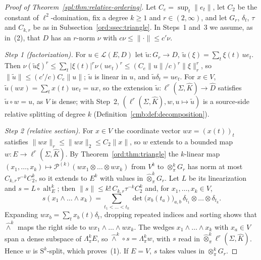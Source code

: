 \documentclass[11pt]{amsart}
\theoremstyle{definition}
\theoremstyle{remark}
\numberwithin{equation}{section}
\newcommand{\cL}{\mathcal L}
\newcommand{\abs}[1]{\lvert #1\rvert}
\newcommand{\norm}[1]{\lVert #1\rVert}
\newcommand{\Kh}{\widehat K}
\theoremstyle{plain}
\theoremstyle{definition}
\theoremstyle{plain}
\newcommand{\alt}{\operatorname{alt}}
\newcommand{\cP}{\mathcal P}
\begin{document}
\begin{proof}[Proof of Theorem~\ref{spl:thm:relative-ordering}]
Let $C_e=\sup_t\norm{e_t}$, let $C_2$ be the constant of $\ell^2$\nobreakdash-domination, fix a degree $k\ge1$ and
$r\in(2,\infty)$, and let $G_r$, $\delta_t$, $\tau$ and $C_{k,r}$ be as in Subsection~\ref{ord:ssec:triangle}. In
Steps~1 and~3 we assume, as in~(2), that $D$ has an $r$\nobreakdash-norm $\nu$ with $c\nu\le\norm\cdot\le c'\nu$.

\emph{Step 1 (factorization).} For $u\in\cL(E,D)$ let $\tilde u\colon G_r\to D$, $\tilde u(\xi)=\sum_t\xi(t)\,ue_t$. Then
$\nu(\tilde u\xi)^r\le\sum_t\abs{\xi(t)}^r\nu(ue_t)^r\le(C_e\norm u/c)^r\norm\xi_r^r$, so
$\norm{\tilde u}\le(c'/c)C_e\norm u$; $\tilde u$ is linear in $u$, and $\tilde u\delta_t=ue_t$. For $x\in V$,
$\tilde u(wx)=\sum_tx(t)\,ue_t=ux$, so the extension $\tilde u\colon\ell^r(\Sigma,\Kh)\to\widehat D$ satisfies
$\tilde u\circ w=u$, as $V$ is dense; with Step~2, $(\ell^r(\Sigma,\Kh),w,u\mapsto\tilde u)$ is a source-side relative
splitting of degree $k$ (Definition~\ref{cmb:def:decomposition}).

\emph{Step 2 (relative section).} For $x\in V$ the coordinate vector $wx=(x(t))_t$ satisfies
$\norm{wx}_r\le\norm{wx}_2\le C_2\norm x$, so $w$ extends to a bounded map $w\colon E\to\ell^r(\Sigma,\Kh)$. By
Theorem~\ref{ord:thm:triangle} the $k$\nobreakdash-linear map $(x_1,\dots,x_k)\mapsto\cP^{(k)}(wx_1\otimes\dots\otimes wx_k)$
from $V^k$ to $\otimes^k_\pi G_r$ has norm at most $C_{k,r}\tau^{-k}C_2^k$, so it extends to $E^k$ with values in
$\widehat\otimes^k_\pi G_r$. Let $L$ be its linearization and $s=L\circ\alt^k_E$; then
$\norm s\le k!\,C_{k,r}\tau^{-k}C_2^k$ and, for $x_1,\dots,x_k\in V$,
\begin{equation}\label{ord:eq:relative-section}
 s(x_1\wedge\dots\wedge x_k)=\sum_{t_1<\dots<t_k}\det\bigl(x_b(t_a)\bigr)_{a,b}\,\delta_{t_1}\otimes\dots\otimes\delta_{t_k}.
\end{equation}
Expanding $wx_b=\sum_tx_b(t)\delta_t$, dropping repeated indices and sorting shows that $\widehat\wedge^k$ maps the
right side to $wx_1\wedge\dots\wedge wx_k$. The wedges $x_1\wedge\dots\wedge x_k$ with $x_a\in V$ span a dense
subspace of $\Lambda^k_\pi E$, so $\widehat\wedge^k\circ s=\Lambda^k_\pi w$, with $s$ read in
$\widehat\otimes^k_\pi\ell^r(\Sigma,\Kh)$. Hence $w$ is $\mathrm S^k$\nobreakdash-split, which proves~(1). If $E=V$, $s$ takes values in
$\otimes^k_\pi G_r$.


\end{proof}
\end{document}
